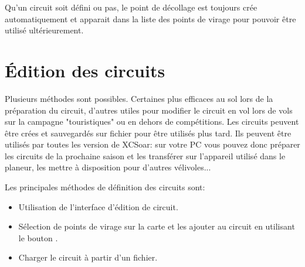 Qu'un circuit soit défini ou pas, le point de décollage est toujours crée automatiquement et apparait dans la liste des points de virage pour pouvoir être utilisé ultérieurement.

\section{Édition des circuits}

Plusieurs méthodes sont possibles. Certaines plus efficaces au sol lors de la préparation du circuit, d'autres utiles pour modifier le circuit en vol lors de vols sur la campagne "touristiques" ou en dehors de compétitions. Les circuits peuvent être crées et sauvegardés sur fichier pour être utilisés plus tard. Ils peuvent être utilisés par toutes les version de XCSoar: sur votre PC vous pouvez donc préparer les circuits de la prochaine saison et les transférer sur l'appareil utilisé dans le planeur, les mettre à disposition pour d'autres vélivoles...


Les principales méthodes de définition des circuits sont:
\begin{itemize}
\item Utilisation de l'interface d'édition de circuit.
\item Sélection de points de virage sur la carte et les ajouter au circuit en utilisant le bouton .
\item Charger le circuit à partir d'un fichier.
\end{itemize}

%

